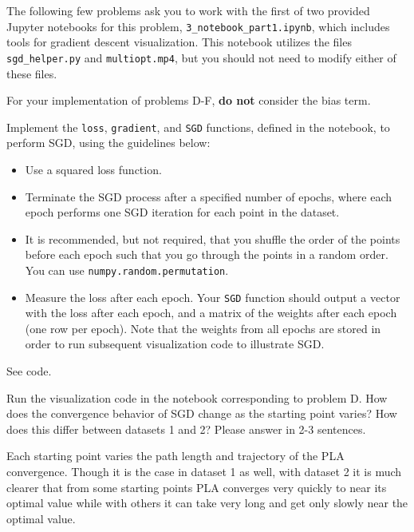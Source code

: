 The following few problems ask you to work with the first of two provided Jupyter notebooks for this problem, \texttt{3_notebook_part1.ipynb}, which includes tools for gradient descent visualization. This notebook utilizes the files \texttt{sgd_helper.py} and \texttt{multiopt.mp4}, but you should not need to modify either of these files. 

For your implementation of problems D-F, \textbf{do not} consider the bias term.

\begin{problem}[6]
  Implement the \texttt{loss}, \texttt{gradient}, and \texttt{SGD} functions, defined in the notebook, to perform SGD, using the guidelines below:

  \begin{itemize}
    \item Use a squared loss function.
    \item Terminate the SGD process after a specified number of epochs, where each epoch performs one SGD iteration for each point in the dataset.
    \item It is recommended, but not required, that you shuffle the order of the points before each epoch such that you go through the points in a random order. You can use \texttt{numpy.random.permutation}.
    \item Measure the loss after each epoch. Your \texttt{SGD} function should output a vector with the loss after each epoch, and a matrix of the weights after each epoch (one row per epoch). Note that the weights from all epochs are stored in order to run subsequent visualization code to illustrate SGD.
  \end{itemize}
\end{problem}
\begin{solution}
See code. %
\end{solution}

\begin{problem}[2]
  Run the visualization code in the notebook corresponding to problem D. How does the convergence behavior of SGD change as the starting point varies? How does this differ between datasets 1 and 2? Please answer in 2-3 sentences.
\end{problem}
\begin{solution}
  Each starting point varies the path length and trajectory of the PLA convergence. Though it is the case in dataset 1 as well, with dataset 2 it is much clearer that from some starting points PLA converges very quickly to near its optimal value while with others it can take very long and get only slowly near the optimal value.
\end{solution}


